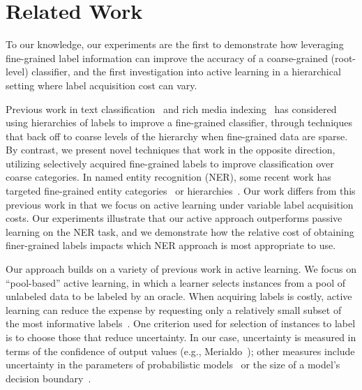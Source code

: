 \documentclass[10pt, conference, compsocconf]{IEEEtran}
\begin{document}


%


\section{Related Work}
\label{sec:relwork}

To our knowledge, our experiments are the first to demonstrate
how leveraging fine-grained label information can improve the
accuracy of a coarse-grained (root-level) classifier, and the first
investigation into active learning in a hierarchical setting where
label acquisition cost can vary.

Previous work in text classification~\cite{mccallum1998improving} and rich media indexing~\cite{jiang2013} has considered using
hierarchies of labels to improve a fine-grained classifier, through
techniques that back off to coarse
levels of the hierarchy when fine-grained data are sparse. 
By contrast, we present novel techniques
that work in the opposite direction, utilizing selectively
acquired fine-grained labels to improve
classification over coarse categories.
In named entity recognition (NER), some recent work has targeted
fine-grained entity categories~\cite{fleischman2002fine,ling2012fine}
or hierarchies~\cite{yosef2012hyena}.  Our work differs from this
previous work in that we focus on active learning under variable
label acquisition costs.
Our experiments illustrate that our active approach outperforms
passive learning on the NER task, and we demonstrate how the
relative cost of obtaining finer-grained labels impacts
which NER approach is most appropriate to use.

Our approach builds on a variety of previous work in active learning.
We focus on ``pool-based'' active learning, in which
a learner selects instances from a pool of unlabeled data to be 
labeled by an oracle. When acquiring
labels is costly, active learning can reduce
the expense by requesting only a relatively small subset
of the most informative labels~\cite{Rubens2011}.
One criterion used for selection of instances to label is to
choose those that reduce uncertainty. In our case,
uncertainty is measured in terms of the confidence of output values
(e.g., Merialdo~\cite{Merialdo2001}); other measures include
uncertainty in the parameters of probabilistic models~\cite{Hofmann2003}
or the size of a model's decision boundary~\cite{Schohn2000}.  
\end{document}
